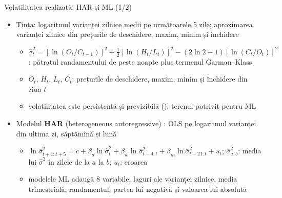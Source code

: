 \begin{frame}{Volatilitatea realizată: HAR și ML (1/2)}
\itemsize{\footnotesize}
\begin{itemize}
    \item Ținta: logaritmul varianței zilnice medii pe următoarele 5 zile; aproximarea varianței zilnice din prețurile de deschidere, maxim, minim și închidere 
    \begin{itemize}
        \item $\hat\sigma_t^2 = [\ln(O_t/C_{t-1})]^2 + \frac12[\ln(H_t/L_t)]^2 - (2\ln 2 - 1)[\ln(C_t/O_t)]^2$: pătratul randamentului de peste noapte plus termenul Garman--Klass
        \item $O_t$, $H_t$, $L_t$, $C_t$: prețurile de deschidere, maxim, minim și închidere din ziua $t$
        \item volatilitatea este persistentă și previzibilă (): terenul potrivit pentru ML
    \end{itemize}
    \item Modelul \textbf{HAR} (heterogeneous autoregressive) : OLS pe logaritmul varianței din ultima zi, săptămînă și lună
    \begin{itemize}
        \item $\ln \bar\sigma^2_{t+1:t+5} = c + \beta_d \ln\hat\sigma_t^2 + \beta_w \ln\bar\sigma^2_{t-4:t} + \beta_m \ln\bar\sigma^2_{t-21:t} + u_t$; $\bar\sigma^2_{a:b}$: media lui $\hat\sigma^2$ în zilele de la $a$ la $b$; $u_t$: eroarea
        \item modelele ML adaugă 8 variabile: laguri ale varianței zilnice, media trimestrială, randamentul, partea lui negativă și valoarea lui absolută
    \end{itemize}
\end{itemize}
\end{frame}

